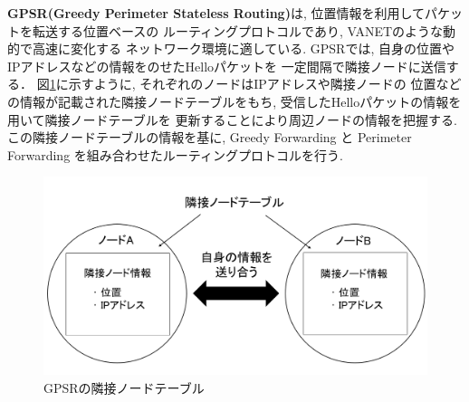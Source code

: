 \textbf{GPSR(Greedy Perimeter Stateless Routing)}\cite{gpsr}は, 
位置情報を利用してパケットを転送する位置ベースの
ルーティングプロトコルであり, VANETのような動的で高速に変化する
ネットワーク環境に適している.
GPSRでは, 自身の位置やIPアドレスなどの情報をのせたHelloパケットを
一定間隔で隣接ノードに送信する．
図\ref{fig:nodetable}に示すように, それぞれのノードはIPアドレスや隣接ノードの
位置などの情報が記載された隣接ノードテーブルをもち, 
受信したHelloパケットの情報を用いて隣接ノードテーブルを
更新することにより周辺ノードの情報を把握する. 
この隣接ノードテーブルの情報を基に, Greedy Forwarding と 
Perimeter Forwarding を組み合わせたルーティングプロトコルを行う. 

\begin{figure}
  \centering
  \includegraphics[scale=0.7]{figures/nodetable.png}
  \caption{GPSRの隣接ノードテーブル}
  \label{fig:nodetable}
\end{figure}

\\

\\
